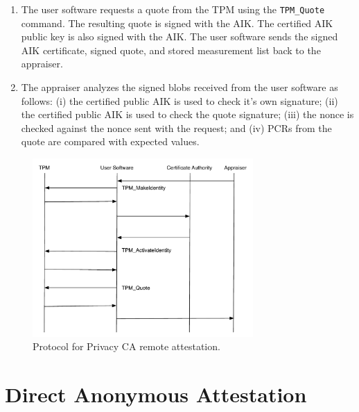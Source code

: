 \documentclass[10pt]{article}
\begin{document}
\begin{enumerate}
\item The user software requests a quote from the TPM using the
  \verb+TPM_Quote+ command.  The resulting quote is signed with the
  AIK.  The certified AIK public key is also signed with the AIK.  The
  user software sends the signed AIK certificate, signed quote, and
  stored measurement list back to the appraiser.

\item The appraiser analyzes the signed blobs received from the user
  software as follows: (i) the certified public AIK is used to check
  it's own signature; (ii) the certified public AIK is used to check
  the quote signature; (iii) the nonce is checked against the nonce
  sent with the request; and (iv) PCRs from the quote are compared
  with expected values.
\end{enumerate}

\begin{figure}
  \centering
  \includegraphics[width=0.75\textwidth]{figures/ca-attestation.pdf}
  \caption{Protocol for Privacy CA remote attestation.}
  \label{fig:ca-attestation}
\end{figure}


\section{Direct Anonymous Attestation}


\end{document}
